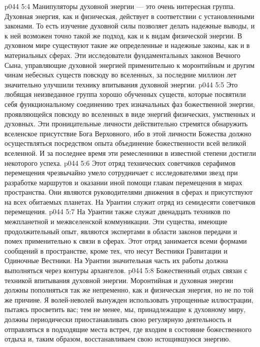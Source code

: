 \vs p044 5:4 \pc {}\bibnobreakspace {} Манипуляторы духовной энергии --- это очень интересная группа. Духовная энергия, как и физическая, действует в соответствии с установленными законами. То есть изучение духовной силы позволяет делать надежные выводы, и к ней возможен точно такой же подход, как и к видам физической энергии. В духовном мире существуют такие же определенные и надежные законы, как и в материальных сферах. Эти исследователи фундаментальных законов Вечного Сына, управляющие духовной энергией применительно к моронтийным и другим чинам небесных существ повсюду во вселенных, за последние миллион лет значительно улучшили технику впитывания духовной энергии.
\vs p044 5:5 \pc {}\bibnobreakspace {} Это любящая неизведанное группа хорошо обученных существ, которые посвятили себя функциональному соединению трех изначальных фаз божественной энергии, проявляющейся повсюду во вселенных в виде энергий физических, умственных и духовных. Эти проницательные личности действительно стремятся обнаружить вселенское присутствие Бога Верховного, ибо в этой личности Божества должно осуществляться посредством опыта объединение божественности всей великой вселенной. И за последнее время эти ремесленники в известной степени достигли некоторого успеха.
\vs p044 5:6 \pc {}\bibnobreakspace {} Этот отряд технических советчиков серафимов перемещения чрезвычайно умело сотрудничает с исследователями звезд при разработке маршрутов и оказании иной помощи главам перемещения в мирах пространства. Они являются руководителями движения в сферах и присутствуют на всех обитаемых планетах. На Урантии служит отряд из семидесяти советчиков перемещения.
\vs p044 5:7 \pc {}\bibnobreakspace {} На Урантии также служат двенадцать техников по межпланетной и межвселенской коммуникации. Эти существа, имеющие продолжительный опыт, являются экспертами в области законов передачи и помех применительно к связи в сферах. Этот отряд занимается всеми формами сообщений в пространстве, кроме тех, что несут Вестники Гравитации и Одиночные Вестники. На Урантии значительная часть их работы должна выполняться через контуры архангелов.
\vs p044 5:8 \pc {}\bibnobreakspace {} Божественный отдых связан с техникой впитывания духовной энергии. Моронтийная и духовная энергии должны пополняться так же непременно, как и физическая энергия, но не по той же причине. Я волей\hyp{}неволей вынужден использовать упрощенные иллюстрации, пытаясь просветить вас; тем не менее, мы, принадлежащие к духовному миру, должны периодически приостанавливать свою регулярную деятельность и отправляться в подходящие места встреч, где входим в состояние божественного отдыха и, таким образом, восстанавливаем свою истощившуюся энергию.
